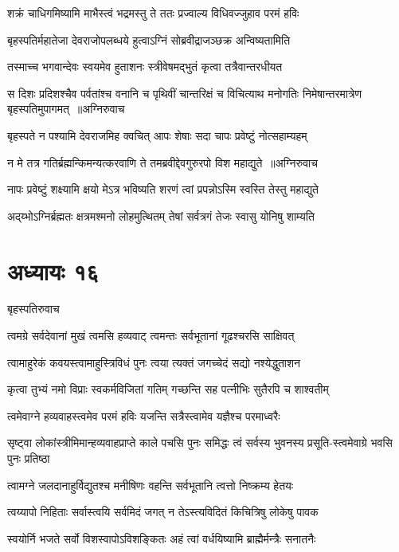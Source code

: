 \twolineshloka
{शक्रं चाधिगमिष्यामि माभैस्त्वं भद्रमस्तु ते}
{ततः प्रज्वाल्य विधिवज्जुहाव परमं हविः}


\twolineshloka
{बृहस्पतिर्महातेजा देवराजोपलब्धये}
{हुत्वाऽग्निं सोब्रवीद्राजञ्छक्र अन्विष्यतामिति}


\twolineshloka
{तस्माच्च भगवान्देवः स्वयमेव हुताशनः}
{स्त्रीवेषमद्भुतं कृत्वा तत्रैवान्तरधीयत}


\fourlineindentedshloka
{स दिशः प्रदिशश्चैव पर्वतांश्च वनानि च}
{पृथिवीं चान्तरिक्षं च विचित्याथ मनोगतिः}
{निमेषान्तरमात्रेण बृहस्पतिमुपागमत् ॥अग्निरुवाच}
{}


\twolineshloka
{बृहस्पते न पश्यामि देवराजमिह क्वचित्}
{आपः शेषाः सदा चापः प्रवेष्टुं नोत्सहाम्यहम्}


\threelineshloka
{न मे तत्र गतिर्ब्रह्मन्किमन्यत्करवाणि ते}
{तमब्रवीद्देवगुरुरपो विश महाद्युते ॥अग्निरुवाच}
{}


\twolineshloka
{नापः प्रवेष्टुं शक्ष्यामि क्षयो मेऽत्र भविष्यति}
{शरणं त्वां प्रपन्नोऽस्मि स्वस्ति तेस्तु महाद्युते}


\twolineshloka
{अद्य्भोऽग्निर्ब्रह्मतः क्षत्रमश्मनो लोहमुत्थितम्}
{तेषां सर्वत्रगं तेजः स्वासु योनिषु शाम्यति}


\chapter{अध्यायः १६}
\twolineshloka
{बृहस्पतिरुवाच}
{}


\twolineshloka
{त्वमग्रे सर्वदेवानां मुखं त्वमसि हव्यवाट्}
{त्वमन्तः सर्वभूतानां गूढश्चरसि साक्षिवत्}


\twolineshloka
{त्वामाहुरेकं कवयस्त्वामाहुस्त्रिविधं पुनः}
{त्वया त्यक्तं जगच्चेदं सद्यो नश्येद्धुताशन}


\twolineshloka
{कृत्वा तुभ्यं नमो विप्राः स्वकर्मविजितां गतिम्}
{गच्छन्ति सह पत्नीभिः सुतैरपि च शाश्वतीम्}


\twolineshloka
{त्वमेवाग्ने हव्यवाहस्त्वमेव परमं हविः}
{यजन्ति सत्रैस्त्वामेव यज्ञैश्च परमाध्वरैः}


\twolineshloka
{सृष्ट्वा लोकांस्त्रीमिमान्हव्यवाहप्राप्ते काले पचसि पुनः समिद्धः}
{त्वं सर्वस्य भुवनस्य प्रसूति-स्त्वमेवाग्रे भवसि पुनः प्रतिष्ठा}


\twolineshloka
{त्वामग्ने जलदानाहुर्विद्युतश्च मनीषिणः}
{वहन्ति सर्वभूतानि त्वत्तो निष्क्रम्य हेतयः}


\twolineshloka
{त्वय्यापो निहिताः सर्वास्त्वयि सर्वमिदं जगत्}
{न तेऽस्त्यविदितं किचित्रिषु लोकेषु पावक}


\twolineshloka
{स्वयोर्नि भजते सर्वो विशस्वापोऽविशङ्कितः}
{अहं त्वां वर्धयिष्यामि ब्राह्मैर्मन्त्रैः सनातनैः}


